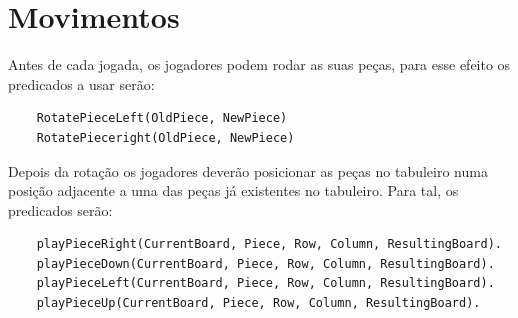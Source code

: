 \documentclass[a4paper]{article}
\begin{document}
\section{Movimentos}

Antes de cada jogada, os jogadores podem rodar as suas peças, para esse efeito os predicados a usar serão:
\begin{lstlisting}
	RotatePieceLeft(OldPiece, NewPiece)
	RotatePieceright(OldPiece, NewPiece)
\end{lstlisting}
Depois da rotação os jogadores deverão posicionar as peças no tabuleiro numa posição adjacente a uma das peças já existentes no tabuleiro. Para tal, os predicados serão:
\begin{lstlisting}
	playPieceRight(CurrentBoard, Piece, Row, Column, ResultingBoard).
	playPieceDown(CurrentBoard, Piece, Row, Column, ResultingBoard).
	playPieceLeft(CurrentBoard, Piece, Row, Column, ResultingBoard).
	playPieceUp(CurrentBoard, Piece, Row, Column, ResultingBoard).
\end{lstlisting}
\end{document}
